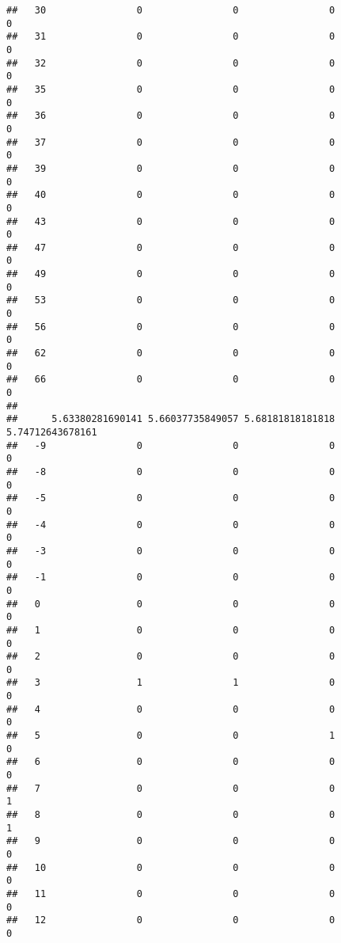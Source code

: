 \documentclass[]{article}
\begin{document}
\begin{verbatim}
##   30                0                0                0                0
##   31                0                0                0                0
##   32                0                0                0                0
##   35                0                0                0                0
##   36                0                0                0                0
##   37                0                0                0                0
##   39                0                0                0                0
##   40                0                0                0                0
##   43                0                0                0                0
##   47                0                0                0                0
##   49                0                0                0                0
##   53                0                0                0                0
##   56                0                0                0                0
##   62                0                0                0                0
##   66                0                0                0                0
##     
##      5.63380281690141 5.66037735849057 5.68181818181818 5.74712643678161
##   -9                0                0                0                0
##   -8                0                0                0                0
##   -5                0                0                0                0
##   -4                0                0                0                0
##   -3                0                0                0                0
##   -1                0                0                0                0
##   0                 0                0                0                0
##   1                 0                0                0                0
##   2                 0                0                0                0
##   3                 1                1                0                0
##   4                 0                0                0                0
##   5                 0                0                1                0
##   6                 0                0                0                0
##   7                 0                0                0                1
##   8                 0                0                0                1
##   9                 0                0                0                0
##   10                0                0                0                0
##   11                0                0                0                0
##   12                0                0                0                0

\end{verbatim}
\end{document}
